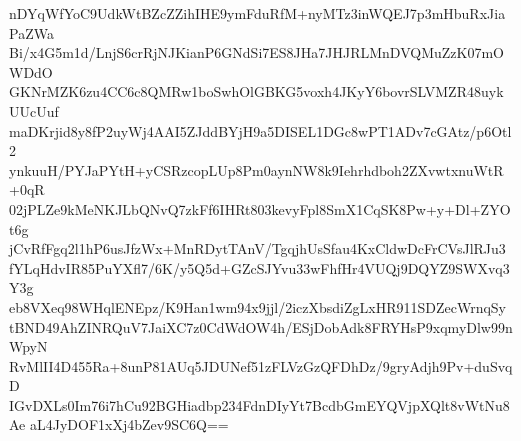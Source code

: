 nDYqWfYoC9UdkWtBZcZZihIHE9ymFduRfM+nyMTz3inWQEJ7p3mHbuRxJiaPaZWa
Bi/x4G5m1d/LnjS6crRjNJKianP6GNdSi7ES8JHa7JHJRLMnDVQMuZzK07mOWDdO
GKNrMZK6zu4CC6c8QMRw1boSwhOlGBKG5voxh4JKyY6bovrSLVMZR48uykUUcUuf
maDKrjid8y8fP2uyWj4AAI5ZJddBYjH9a5DISEL1DGc8wPT1ADv7cGAtz/p6Otl2
ynkuuH/PYJaPYtH+yCSRzcopLUp8Pm0aynNW8k9Iehrhdboh2ZXvwtxnuWtR+0qR
02jPLZe9kMeNKJLbQNvQ7zkFf6IHRt803kevyFpl8SmX1CqSK8Pw+y+Dl+ZYOt6g
jCvRfFgq2l1hP6usJfzWx+MnRDytTAnV/TgqjhUsSfau4KxCldwDcFrCVsJlRJu3
fYLqHdvIR85PuYXfl7/6K/y5Q5d+GZcSJYvu33wFhfHr4VUQj9DQYZ9SWXvq3Y3g
eb8VXeq98WHqlENEpz/K9Han1wm94x9jjl/2iczXbsdiZgLxHR911SDZecWrnqSy
tBND49AhZINRQuV7JaiXC7z0CdWdOW4h/ESjDobAdk8FRYHsP9xqmyDlw99nWpyN
RvMlII4D455Ra+8unP81AUq5JDUNef51zFLVzGzQFDhDz/9gryAdjh9Pv+duSvqD
IGvDXLs0Im76i7hCu92BGHiadbp234FdnDIyYt7BcdbGmEYQVjpXQlt8vWtNu8Ae
aL4JyDOF1xXj4bZev9SC6Q==
